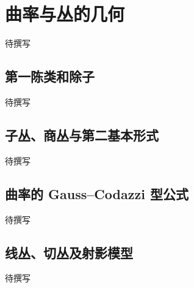 
% 
% 
% 

\section{曲率与丛的几何}
\label{g4:sec:1604}

待撰写

\subsection{第一陈类和除子}
\label{g4:subsec:1604:01}
待撰写

\subsection{子丛、商丛与第二基本形式}
\label{g4:subsec:1604:02}
待撰写

\subsection{曲率的 Gauss–Codazzi 型公式}
\label{g4:subsec:1604:03}
待撰写

\subsection{线丛、切丛及射影模型}
\label{g4:subsec:1604:04}
待撰写
